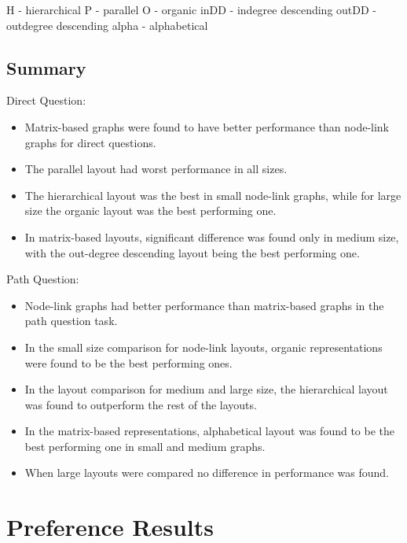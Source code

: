 \documentclass{l4proj}
\begin{document}
H - hierarchical P - parallel O - organic inDD - indegree descending outDD - outdegree descending alpha - alphabetical

\subsection{Summary}

Direct Question:
\begin{itemize}
	\item Matrix-based graphs were found to have better performance than node-link graphs for direct questions.
	\item The parallel layout had worst performance in all sizes.
	\item The hierarchical layout was the best in small node-link graphs, while for large size the organic layout was the best performing one.
	\item In matrix-based layouts, significant difference was found only in medium size, with the out-degree descending layout being the best performing one.
\end{itemize}
Path Question:
\begin{itemize}
	\item Node-link graphs had better performance than matrix-based graphs in the path question task.
	\item In the small size comparison for node-link layouts, organic representations were found to be the best performing ones.
	\item In the layout comparison for medium and large size, the hierarchical layout was found to outperform the rest of the layouts.
	\item In the matrix-based representations, alphabetical layout was found to be the best performing one in small and medium graphs.
	\item When large layouts were compared no difference in performance was found.
\end{itemize}


\section{Preference Results} 
\end{document}
